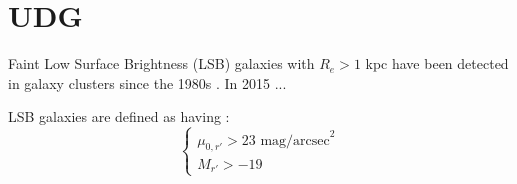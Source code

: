 
\chapter{UDG}
\label{ch:UDG}
Faint Low Surface Brightness (LSB) galaxies with $R_e > 1$ kpc have been detected in galaxy clusters since the 1980s \citep[e.g.]{Sandage1984}.
In 2015 \citet{VanDokkum2015}... %

LSB galaxies are defined as having \citep{Venhola2017}:
\begin{equation}
\begin{cases}
 \mu_{0,r'} > 23 \mbox{ mag/arcsec}^2\\

 M_{r'} > -19
\end{cases}
\end{equation}



% 

